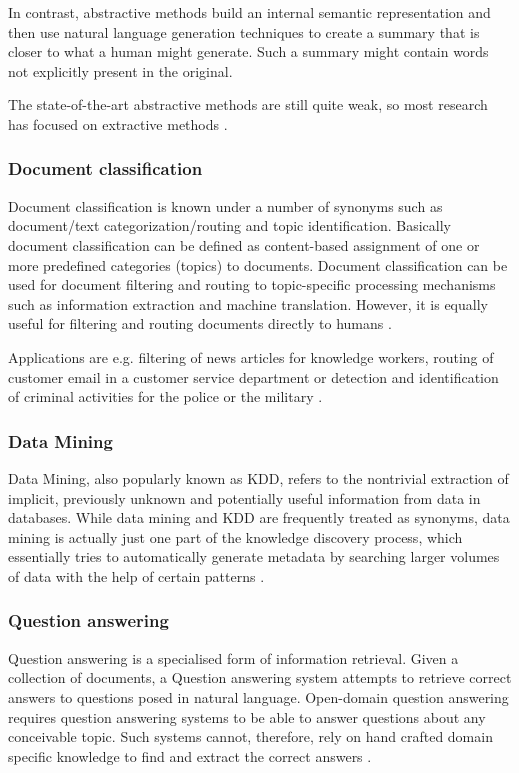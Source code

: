 In contrast, abstractive methods build an internal semantic representation and then use natural language generation techniques to create a summary that is closer to what a human might generate. Such a summary might contain words not explicitly present in the original.

The state-of-the-art abstractive methods are still quite weak, so most research has focused on extractive methods \cite{Goldberg:2007}.

\subsubsection{Document classification}
Document classification is known under a number of synonyms such as document/text categorization/routing and topic identification. Basically document classification can be defined as content-based assignment of one or more predefined categories (topics) to documents. Document classification can be used for document filtering and routing to topic-specific processing mechanisms such as information extraction and machine translation. However, it is equally useful for filtering and routing documents directly to humans \cite{Knorz:2000}.

Applications are e.g. filtering of news articles for knowledge workers, routing of customer email in a customer service department or detection and identification of criminal activities for the police or the military \cite{Knorz:2000}.

\subsubsection{Data Mining}
Data Mining, also popularly known as \gls{KDD}, refers to the nontrivial extraction of implicit, previously unknown and potentially useful information from data in databases. While data mining and \gls{KDD} are frequently treated as synonyms, data mining is actually just one part of the knowledge discovery process, which essentially tries to automatically generate metadata by searching larger volumes of data with the help of certain patterns \cite{Zaiane:1999}. 

\subsubsection{Question answering}
Question answering is a specialised form of information retrieval. Given a collection of documents, a Question answering system attempts to retrieve correct answers to questions posed in natural language. Open-domain question answering requires question answering systems to be able to answer questions about any conceivable topic. Such systems cannot, therefore, rely on hand crafted domain specific knowledge to find and extract the correct answers \cite{Lampert:2004}.

